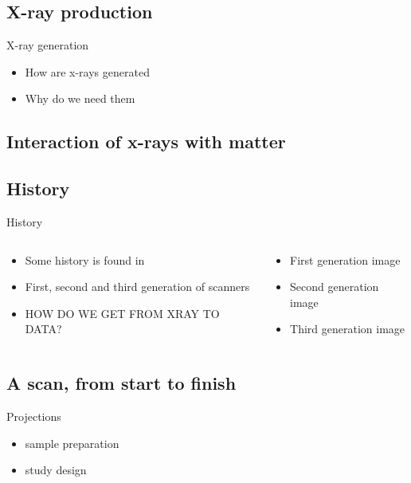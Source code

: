 \documentclass[aspectratio=169,10pt,draft]{beamer}
\begin{document}
\subsection{X-ray production}
\begin{frame}{X-ray generation}
	\begin{itemize}
		\item How are x-rays generated
		\item Why do we need them
	\end{itemize}
\end{frame}


\subsection{Interaction of x-rays with matter}

\subsection{History}
\begin{frame}{History}
	\begin{columns}
		\begin{column}{0.5\linewidth}
			\begin{itemize}
				\item<1-> Some history is found in~\cite{Cormack1963a}
				\item<2-> First, second and third generation of scanners
				\item<5> HOW DO WE GET FROM XRAY TO DATA?
			\end{itemize}
		\end{column}
		\begin{column}{0.5\linewidth}
			\begin{itemize}
				\item<2> First generation image
				\item<3> Second generation image
				\item<4> Third generation image
			\end{itemize}
		\end{column}
	\end{columns}		
\end{frame}

\subsection{A scan, from start to finish}
\begin{frame}{Projections}
	\begin{itemize}
		\item sample preparation
		\item study design
	\end{itemize}
\end{frame}
\end{document}
